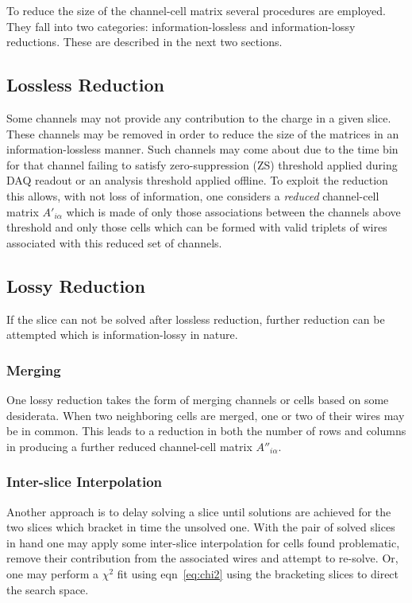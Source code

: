 \documentclass[letter]{article}
\begin{document}
To reduce the size of the channel-cell matrix several procedures are
employed.
They fall into two categories: information-lossless and
information-lossy reductions.
These are described in the next two sections.



\subsection{Lossless Reduction}

Some channels may not provide any contribution to the charge in a
given slice.
These channels may be removed in order to reduce the size of the
matrices in an information-lossless manner.
Such channels may come about due to the time bin for that channel failing to
satisfy zero-suppression (ZS) threshold applied during DAQ readout or
an analysis threshold applied offline.
To exploit the reduction this allows, with not loss of information,
one considers a \textit{reduced} channel-cell matrix
$A'_{i\alpha}$ which is made of only those associations
between the channels above threshold and only those cells which can be
formed with valid triplets of wires associated with this reduced set of
channels.

\subsection{Lossy Reduction}

If the slice can not be solved after lossless reduction, further
reduction can be attempted which is information-lossy in nature.


\subsubsection{Merging}

One lossy reduction takes the form of merging channels or cells based on
some desiderata.
When two neighboring cells are merged, one or two of their wires may be in common.
This leads to a reduction in both the number of rows and columns in
producing a further reduced channel-cell matrix $A''_{i\alpha}$.

\subsubsection{Inter-slice Interpolation}

Another approach is to delay solving a slice until solutions are
achieved for the two slices which
bracket in time the unsolved one.
With the pair of solved slices in hand one may apply some inter-slice
interpolation for cells found problematic, remove their contribution
from the associated wires and attempt to re-solve.
Or, one may perform a $\chi^2$ fit using eqn~\ref{eq:chi2} using the
bracketing slices to direct the search space. 
\end{document}
